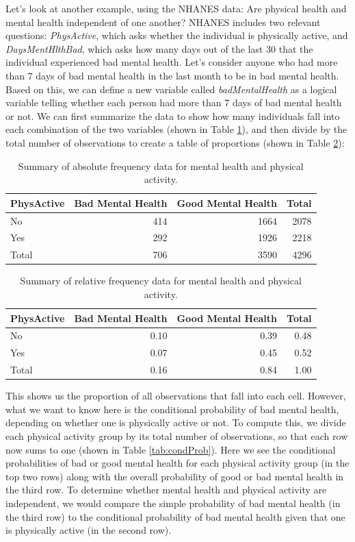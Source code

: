 \documentclass[
  12pt,
]{book}
\begin{document}
Let's look at another example, using the NHANES data: Are physical health and mental health independent of one another? NHANES includes two relevant questions: \emph{PhysActive}, which asks whether the individual is physically active, and \emph{DaysMentHlthBad}, which asks how many days out of the last 30 that the individual experienced bad mental health. Let's consider anyone who had more than 7 days of bad mental health in the last month to be in bad mental health. Based on this, we can define a new variable called \emph{badMentalHealth} as a logical variable telling whether each person had more than 7 days of bad mental health or not. We can first summarize the data to show how many individuals fall into each combination of the two variables (shown in Table \ref{tab:mhCounts}), and then divide by the total number of observations to create a table of proportions (shown in Table \ref{tab:mhProps}):

\begin{table}

\caption{\label{tab:mhCounts}Summary of absolute frequency data for mental health and physical activity.}
\centering
\begin{tabular}[t]{l|r|r|r}
\hline
PhysActive & Bad Mental Health & Good Mental Health & Total\\
\hline
No & 414 & 1664 & 2078\\
\hline
Yes & 292 & 1926 & 2218\\
\hline
Total & 706 & 3590 & 4296\\
\hline
\end{tabular}
\end{table}

\begin{table}

\caption{\label{tab:mhProps}Summary of relative frequency data for mental health and physical activity.}
\centering
\begin{tabular}[t]{l|r|r|r}
\hline
PhysActive & Bad Mental Health & Good Mental Health & Total\\
\hline
No & 0.10 & 0.39 & 0.48\\
\hline
Yes & 0.07 & 0.45 & 0.52\\
\hline
Total & 0.16 & 0.84 & 1.00\\
\hline
\end{tabular}
\end{table}

This shows us the proportion of all observations that fall into each cell. However, what we want to know here is the conditional probability of bad mental health, depending on whether one is physically active or not. To compute this, we divide each physical activity group by its total number of observations, so that each row now sums to one (shown in Table \ref{tab:condProb}). Here we see the conditional probabilities of bad or good mental health for each physical activity group (in the top two rows) along with the overall probability of good or bad mental health in the third row. To determine whether mental health and physical activity are independent, we would compare the simple probability of bad mental health (in the third row) to the conditional probability of bad mental health given that one is physically active (in the second row).
\end{document}
